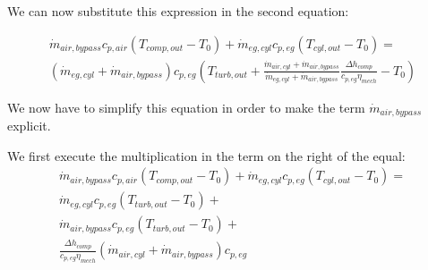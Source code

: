 \documentclass[]{article}
\begin{document}
We can now substitute this expression in the second equation:

\begin{multline}
	\dot{m}_{air,bypass} c_{p,air} (T_{comp,out} - T_0) + \dot{m}_{eg,cyl} c_{p,eg}  (T_{cyl,out} - T_0)  =  \\ 
	(\dot{m}_{eg,cyl} + \dot{m}_{air,bypass}) c_{p,eg} (T_{turb,out} + \frac{\dot{m}_{air,cyl} + \dot{m}_{air,bypass}}{\dot{m}_{eg,cyl} + \dot{m}_{air,bypass}} \frac{\Delta h_{comp}}{c_{p,eg} \eta_{mech}} - T_0)
\end{multline}

We now have to simplify this equation in order to make the term $ \dot{m}_{air,bypass} $ explicit. 
\begin{comment}
One first thing we can do is noticing that the fraction:
$$
\frac{\dot{m}_{air,cyl} + \dot{m}_{air,bypass}}{\dot{m}_{eg,cyl} + \dot{m}_{air,bypass}}
$$
Can be rewritten as:
$$
\frac{1}{1 + \frac{\dot{m}_{fuel,cyl}}{\dot{m}_{air,cyl} + \dot{m}_{air,bypass}}}
$$
Since the numerator of the "subfraction" is much smaller than the denominator, we can make the assumption that this fraction behaves as:
$$
\frac{1}{1 + \epsilon}
$$
For which we know that:
$$
\frac{1}{1 + \epsilon} \approx 1 - \epsilon 
$$
That corresponds to:
$$
1 - \frac{\dot{m}_{fuel,cyl}}{\dot{m}_{air,cyl} + \dot{m}_{air,bypass}}
$$
\begin{multline}
\dot{m}_{air,bypass} c_{p,air} (T_{comp,out} - T_0) + \dot{m}_{eg,cyl} c_{p,eg}  (T_{cyl,out} - T_0)  =  \\ 
(\dot{m}_{eg,cyl} + \dot{m}_{air,bypass}) c_{p,eg} \left[T_{turb,out} + \left( 1 - \frac{\dot{m}_{fuel,cyl}}{\dot{m}_{air,cyl} + \dot{m}_{air,bypass}} \right) \frac{\Delta h_{comp}}{c_{p,eg} \eta_{mech}} - T_0\right]
\end{multline}
\end{comment}

We first execute the multiplication in the term on the right of the equal:
\begin{multline}
\dot{m}_{air,bypass} c_{p,air} (T_{comp,out} - T_0) + \dot{m}_{eg,cyl} c_{p,eg}  (T_{cyl,out} - T_0)  =  \\
\dot{m}_{eg,cyl} c_{p,eg} (T_{turb,out} - T_0) + \\
\dot{m}_{air,bypass} c_{p,eg} (T_{turb,out} - T_0) + \\ 
\frac{\Delta h_{comp}}{c_{p,eg} \eta_{mech}}(\dot{m}_{air,cyl} + \dot{m}_{air,bypass}) c_{p,eg}
\end{multline}
\end{document}
